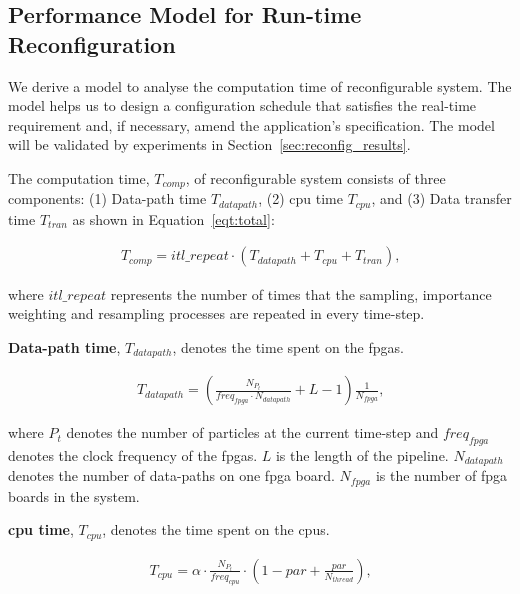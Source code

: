 \subsection{Performance Model for Run-time Reconfiguration}
\label{sec:reconfig_reconfig}

We derive a model to analyse the computation time of reconfigurable system.
The model helps us to design a configuration schedule that satisfies the real-time requirement and, if necessary, amend the application's specification.
The model will be validated by experiments in Section~\ref{sec:reconfig_results}.

The computation time, $T_{comp}$, of reconfigurable system consists of three components: (1) Data-path time $T_{datapath}$, (2) \gls{cpu} time $T_{cpu}$, and (3) Data transfer time $T_{tran}$ as shown in Equation~\ref{eqt:total}:

\begin{equation}
\begin{aligned}
T_{comp} = itl\_repeat \cdot \left ( T_{datapath} + T_{cpu} + T_{tran} \right ) \mbox{,}
\end{aligned}
\label{eqt:total}
\end{equation}

where $itl\_repeat$ represents the number of times that the sampling, importance weighting and resampling processes are repeated in every time-step.

\textbf{Data-path time}, $T_{datapath}$, denotes the time spent on the \glspl{fpga}.

\begin{equation}
\begin{aligned}
T_{datapath} = \left(\frac{{N_{P_t}}}{freq_{fpga} \cdot N_{datapath}} + L - 1 \right) \frac{1}{N_{fpga}} \mbox{,}
\end{aligned}
\label{eqt:kernel}
\end{equation}

where $P_t$ denotes the number of particles at the current time-step and $freq_{fpga}$ denotes the clock frequency of the \glspl{fpga}.
$L$ is the length of the pipeline.
$N_{datapath}$ denotes the number of data-paths on one \gls{fpga} board.
$N_{fpga}$ is the number of \gls{fpga} boards in the system.

\textbf{\gls{cpu} time}, $T_{cpu}$, denotes the time spent on the \glspl{cpu}.

\begin{equation}
\begin{aligned}
T_{cpu} = \alpha \cdot \frac{{N_{P_t}}}{freq_{cpu}} \cdot \left(1-par+\frac{par}{N_{thread}}\right) \mbox{,}
\end{aligned}
\label{eqt:host}
\end{equation}

